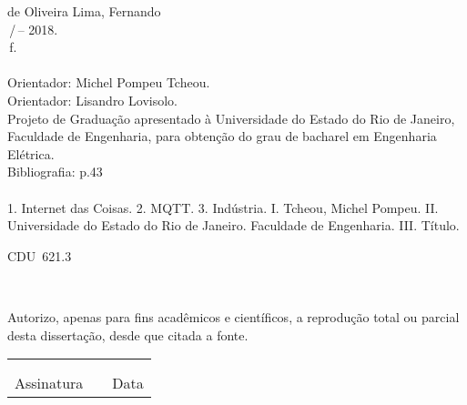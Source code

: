 \begin{titlepage}
\begin{center}
\begin{boxedminipage}{140mm}
{\begin{minipage}[top]{115mm}
		de Oliveira Lima, Fernando\\
		\phantom{XX}\setTitulo\,/\,\setNomeAluno -- 2018.\\
		\phantom{XX}\pageref{LastPage}\,f.\\
		\phantom{XX}\\
		\phantom{XX}Orientador: Michel Pompeu Tcheou.\\
		\phantom{XX}Orientador: Lisandro Lovisolo.\\
       		\phantom{XX}Projeto de Graduação apresentado à Universidade do Estado do Rio de Janeiro, Faculdade de Engenharia, para obtenção do grau de bacharel em Engenharia Elétrica.\\
		\phantom{XX} Bibliografia: p.43\\
		\phantom{XX} \\
		\phantom{XX}  1. Internet das Coisas. 2. MQTT. 3. Indústria. I. Tcheou, Michel Pompeu. II. Universidade do Estado do Rio de Janeiro. Faculdade de Engenharia. III. Título.
	\end{minipage}}
	\vspace*{5mm}
	\begin{flushright}
	 CDU~621.3
	\end{flushright}
    \vspace{1mm}
	\end{boxedminipage}\\
	\end{center}
%
	Autorizo, apenas para fins acadêmicos e científicos, a reprodução total ou parcial desta dissertação, desde que citada a fonte.\\
	\noindent
	\begin{tabular}{ccc}
	\phantom{XXXXXXXXXXXXXXXXXXXXXXXXXXXXXX}&	 \phantom{XX}	&	\phantom{XXXXXXXXXXXXXXXX}	\\
	\phantom{XXXXXXXXXXXXXXXXXXXXXXXXXXXXXX}&	 \phantom{XX}	&	\phantom{XXXXXXXXXXXXXXXX}	\\
	\cline{1-1}\cline{3-3}
	Assinatura &		&	Data
	\end{tabular}
\end{titlepage} 